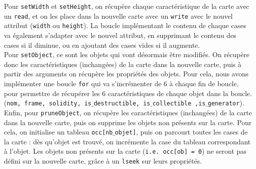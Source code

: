 \documentclass[a4paper, 12pt]{article}
\begin{document}
	 Pour \texttt{setWidth} et \texttt{setHeight}, on récupère chaque caractéristique de la	carte avec un \texttt{read}, et on les place dans la nouvelle carte avec un \texttt{write} avec le nouvel attribut (\texttt{width} ou \texttt{height}). La boucle implémentant le contenu de chaque cases va également s'adapter avec le nouvel attribut, en supprimant le contenu des cases si il diminue, ou en ajoutant des cases vides si il augmente. \\
	
	 Pour \texttt{setObject}, ce sont les objets qui vont désormais être modifiés. On récupère donc les caractéristiques (inchangées) de la carte dans la nouvelle carte, puis à partir des arguments on récupère les propriétés des objets. Pour cela, nous avons implémenter une boucle \texttt{for} qui va s'incrémenter de 6 à chaque fin de boucle, pour permettre de récupérer les 6 caractéristiques de chaque objet dans la boucle. (\texttt{nom, frame, solidity, is$\_$destructible, is$\_$collectible ,is$\_$generator}). \\
	
	 Enfin, pour \texttt{pruneObject}, on récupère les caractéristiques (inchangées) de la carte dans la nouvelle carte, puis on supprime les objets non présents sur la carte. Pour cela, on initialise un tableau \texttt{occ[nb$\_$objet]}, puis on parcourt toutes les cases de la carte : dès qu'objet est trouvé, on incrémente la case du tableau correspondant à l'objet. Les objets non présents sur la carte (\texttt{i.e. occ[ob] = 0}) ne seront pas défini sur la nouvelle carte, grâce à un \texttt{lseek} sur leurs propriétés.\\
\end{document}
